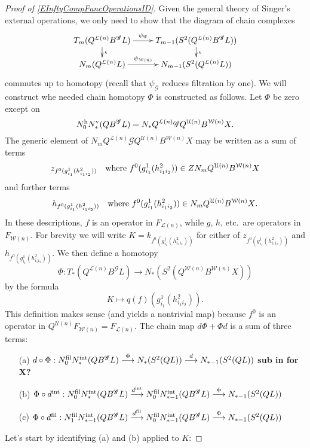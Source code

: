 \documentclass[11pt]{amsart}
\theoremstyle{plain}
\theoremstyle{definition}
\renewcommand{\to}{\longrightarrow}
\newcommand{\squishlist}{
  \setlength{\itemsep}{.5pt}
  \setlength{\parskip}{0pt}
  \setlength{\parsep}{0pt}}
\newcommand{\scrQ}{\mathscr{Q}}
\newcommand{\scrR}{\mathscr{R}}
\newcommand{\scrT}{\mathscr{T}}
\newcommand{\scrY}{\mathscr{Y}}
\newcommand{\scrI}{\mathscr{I}}
\newcommand{\scrO}{\mathscr{O}}
\newcommand{\scrP}{\mathscr{P}}
\newcommand{\scrS}{\mathscr{S}}
\newcommand{\scrG}{\mathscr{G}}
\newcommand{\scrH}{\mathscr{H}}
\newcommand{\scrJ}{\mathscr{J}}
\newcommand{\scrK}{\mathscr{K}}
\newcommand{\scrL}{\mathscr{L}}
\newcommand{\scrZ}{\mathscr{Z}}
\newcommand{\scrN}{\mathscr{N}}
\newcommand{\scrM}{\mathscr{M}}
\newcommand{\calW}{\mathcal{W}}
\newcommand{\calU}{\mathcal{U}}
\newcommand{\calL}{\mathcal{L}}
\theoremstyle{plain}
\newcommand{\BSW}{{\scrG}}%
\newcommand{\BSWres}{B^\BSW}%
\begin{document}
\begin{Composite functor spectral sequences}
\begin{tricky proofs of operation compatibilities}
\begin{proof}[Proof of \ref{EInftyCompFuncOperationsID}]
Given the general theory of Singer's external operations, we only need to show that the diagram of chain complexes
\[\xymatrix@R=4mm{
T_{m}(Q^{\calL(n)}\BSWres L)
\ar[r]^-{\psi_{\BSW}}
\ar[d]^-{\epsilon}
&%
T_{m-1}(S^2(Q^{\calL(n)}\BSWres L))\ar[d]^-{\epsilon}
\\%
N_{m}(Q^{\calL(n)}L)
\ar[r]^-{\psi_{\calW(n)}}
&%
N_{m-1}(S^2(Q^{\calL(n)} L))
}\]
commutes up to homotopy (recall that $\psi_{\BSW}$ reduces filtration by one). We will construct whe needed chain homotopy $\Phi$ is constructed as follows. Let $\Phi$ be zero except on 
\[N_0^\textup{h}N_*^\textup{v}(Q\BSWres L)=N_*Q^{\calL(n)}\BSW Q^{\calU(n)}B^{\calW(n)}X.\]
The generic element of $N_mQ^{\calL(n)}\BSW Q^{\calU(n)}B^{\calW(n)}X$ may be written as a sum of terms
\[z_{f^0(g^1_{i_1}(h^2_{i_1i_2}))}\textup{\quad where $f^0(g^1_{i_1}(h^2_{i_1i_2}))\in ZN_m Q^{\calU(n)}B^{\calW(n)}X$}\]
and further terms
\[h_{f^0(g^1_{i_1}(h^2_{i_1i_2}))}\textup{\quad where $f^0(g^1_{i_1}(h^2_{i_1i_2}))\in N_{m} Q^{\calU(n)}B^{\calW(n)}X$}.\]
In these descriptions, $f$ is an operator in $F_{\calL(n)}$, while $g$, $h$, etc.\ are operators in $F_{\calW(n)}$.
For brevity we will write $K=k_{f^0(g^1_{i_1}(h^2_{i_1i_2}))}$ for either of $z_{f^0(g^1_{i_1}(h^2_{i_1i_2}))}$ and $h_{f^0(g^1_{i_1}(h^2_{i_1i_2}))}$.
We then define a homotopy 
\[\Phi:T_*(Q^{\calL(n)}\BSWres L)\to N_*(S^2(Q^{\calW(n)}B^{\calW(n)}X))\]
by the formula
\[K\mapsto q(f)(g^1_{i_1}(h^2_{i_1i_2})).\]
This definition makes sense (and yields a nontrivial map) because $f^0$ is an operator in $Q^{\calU(n)}F_{\calW(n)}=F_{\calL(n)}$.
The chain map $d\Phi+\Phi d$ is a sum of three terms:
\begin{enumerate}\squishlist
\setlength{\parindent}{.25in}
\item[(a)] $d\circ\Phi:N_0^\textup{fil}N_*^\textup{int}(Q\BSWres L)\overset{\Phi}{\to} N_*(S^2(QL))\overset{d}{\to} N_{*-1}(S^2(QL))$ \textbf{sub in for X?}
\item[(b)] $\Phi\circ d^\textup{int}:N_0^\textup{fil}N_{*}^\textup{int}(Q\BSWres L)\overset{d^\textup{int}}{\to} N_0^\textup{fil}N_{*-1}^\textup{int}(Q\BSWres L)\overset{\Phi}{\to} N_{*-1}(S^2(QL))$
\item[(c)] $\Phi\circ d^\textup{fil}:N_1^\textup{fil}N_{*-1}^\textup{int}(Q\BSWres L)\overset{d^\textup{fil}}{\to} N_0^\textup{fil}N_{*-1}^\textup{int}(Q\BSWres L)\overset{\Phi}{\to} N_{*-1}(S^2(QL))$
\end{enumerate}
Let's start by identifying (a) and (b) applied to $K$:

\end{proof}
\end{tricky proofs of operation compatibilities}
\end{Composite functor spectral sequences}
\end{document}
